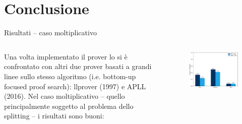 \documentclass{beamer}
\begin{document}
\section{Conclusione}
\begin{frame}{Risultati -- caso moltiplicativo}
	\begin{columns}
		\begin{column}{.5\textwidth}
	Una volta implementato il prover lo si è confrontato con altri due prover basati a grandi linee sullo stesso algoritmo (i.e. bottom-up focused proof search): llprover (1997) e APLL (2016).
	Nel caso moltiplicativo -- quello principalmente soggetto al problema dello splitting -- i risultati sono buoni:
		\end{column}
		\begin{column}{.5\textwidth}
			\begin{figure}[H]
				\centering
				\includegraphics[scale=.4]{images/graph}
			\end{figure}
		\end{column}
	\end{columns}
\end{frame}
\end{document}
